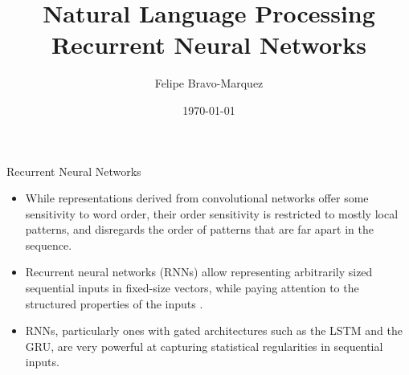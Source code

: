 \documentclass[handout]{beamer}
\title{Natural Language Processing \\ Recurrent Neural Networks}
\author[Felipe Bravo Márquez]{\footnotesize
 \textcolor[rgb]{0.00,0.00,1.00}{Felipe Bravo-Marquez}}
\date{\today}
\begin{document}
\begin{frame}
\titlepage


\end{frame}




\begin{frame}{Recurrent Neural Networks}
\begin{scriptsize}
\begin{itemize}

\item While representations derived from convolutional networks  offer some sensitivity to word order, their order sensitivity is restricted to mostly local patterns, and disregards the order of patterns that are far apart in the sequence.
\item Recurrent neural networks (RNNs) allow representing arbitrarily sized sequential inputs in fixed-size vectors, while paying attention to the structured properties of the inputs \cite{goldberg2016primer}.
\item RNNs, particularly ones with gated architectures such as the LSTM and the GRU, are very powerful at capturing statistical regularities in sequential inputs.

\end{itemize}
\end{scriptsize}
\end{frame}
\end{document}
